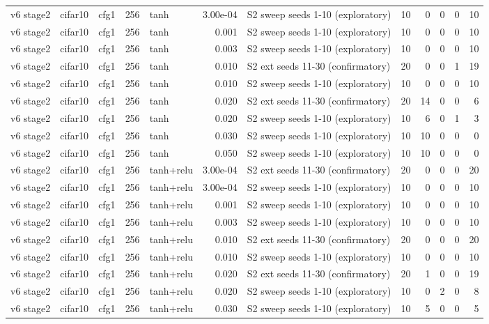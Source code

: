 \begin{table}[htbp]
{\begin{tabular}{@{}lllrlrlrrrrr@{}}
v6 stage2 & cifar10 & cfg1 & 256 & tanh & 3.00e-04 & S2 sweep seeds 1-10 (exploratory) & 10 & 0 & 0 & 0 & 10 \\
v6 stage2 & cifar10 & cfg1 & 256 & tanh & 0.001 & S2 sweep seeds 1-10 (exploratory) & 10 & 0 & 0 & 0 & 10 \\
v6 stage2 & cifar10 & cfg1 & 256 & tanh & 0.003 & S2 sweep seeds 1-10 (exploratory) & 10 & 0 & 0 & 0 & 10 \\
v6 stage2 & cifar10 & cfg1 & 256 & tanh & 0.010 & S2 ext seeds 11-30 (confirmatory) & 20 & 0 & 0 & 1 & 19 \\
v6 stage2 & cifar10 & cfg1 & 256 & tanh & 0.010 & S2 sweep seeds 1-10 (exploratory) & 10 & 0 & 0 & 0 & 10 \\
v6 stage2 & cifar10 & cfg1 & 256 & tanh & 0.020 & S2 ext seeds 11-30 (confirmatory) & 20 & 14 & 0 & 0 & 6 \\
v6 stage2 & cifar10 & cfg1 & 256 & tanh & 0.020 & S2 sweep seeds 1-10 (exploratory) & 10 & 6 & 0 & 1 & 3 \\
v6 stage2 & cifar10 & cfg1 & 256 & tanh & 0.030 & S2 sweep seeds 1-10 (exploratory) & 10 & 10 & 0 & 0 & 0 \\
v6 stage2 & cifar10 & cfg1 & 256 & tanh & 0.050 & S2 sweep seeds 1-10 (exploratory) & 10 & 10 & 0 & 0 & 0 \\
v6 stage2 & cifar10 & cfg1 & 256 & tanh+relu & 3.00e-04 & S2 ext seeds 11-30 (confirmatory) & 20 & 0 & 0 & 0 & 20 \\
v6 stage2 & cifar10 & cfg1 & 256 & tanh+relu & 3.00e-04 & S2 sweep seeds 1-10 (exploratory) & 10 & 0 & 0 & 0 & 10 \\
v6 stage2 & cifar10 & cfg1 & 256 & tanh+relu & 0.001 & S2 sweep seeds 1-10 (exploratory) & 10 & 0 & 0 & 0 & 10 \\
v6 stage2 & cifar10 & cfg1 & 256 & tanh+relu & 0.003 & S2 sweep seeds 1-10 (exploratory) & 10 & 0 & 0 & 0 & 10 \\
v6 stage2 & cifar10 & cfg1 & 256 & tanh+relu & 0.010 & S2 ext seeds 11-30 (confirmatory) & 20 & 0 & 0 & 0 & 20 \\
v6 stage2 & cifar10 & cfg1 & 256 & tanh+relu & 0.010 & S2 sweep seeds 1-10 (exploratory) & 10 & 0 & 0 & 0 & 10 \\
v6 stage2 & cifar10 & cfg1 & 256 & tanh+relu & 0.020 & S2 ext seeds 11-30 (confirmatory) & 20 & 1 & 0 & 0 & 19 \\
v6 stage2 & cifar10 & cfg1 & 256 & tanh+relu & 0.020 & S2 sweep seeds 1-10 (exploratory) & 10 & 0 & 2 & 0 & 8 \\
v6 stage2 & cifar10 & cfg1 & 256 & tanh+relu & 0.030 & S2 sweep seeds 1-10 (exploratory) & 10 & 5 & 0 & 0 & 5 \\

\end{tabular}}
\end{table}
